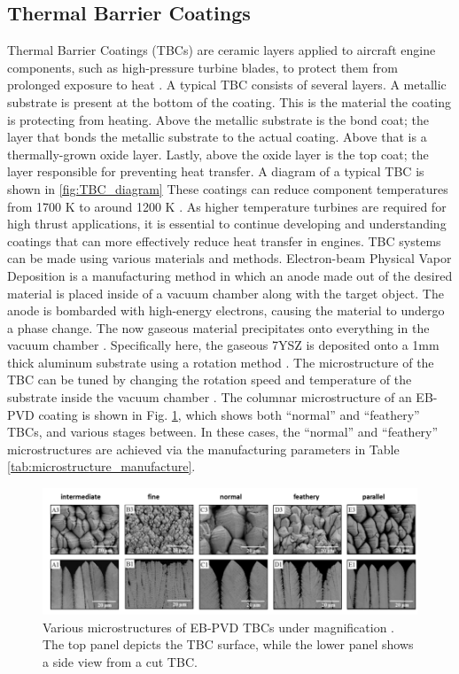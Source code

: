 \documentclass{UCF_ETD}
\begin{document}
\subsection{Thermal Barrier Coatings}
Thermal Barrier Coatings (TBCs) are ceramic layers applied to aircraft engine components, such as high-pressure turbine blades, to protect them from prolonged exposure to heat \cite{Bennett2005}. A typical TBC consists of several layers. A metallic substrate is present at the bottom of the coating. This is the material the coating is protecting from heating. Above the metallic substrate is the bond coat; the layer that bonds the metallic substrate to the actual coating. Above that is a thermally-grown oxide layer. Lastly, above the oxide layer is the top coat; the layer responsible for preventing heat transfer. A diagram of a typical TBC is shown in \ref{fig:TBC_diagram} These coatings can reduce component temperatures from 1700 K to around 1200 K \cite{Sirigiri2018}. As higher temperature turbines are required for high thrust applications, it is essential to continue developing and understanding coatings that can more effectively reduce heat transfer in engines. TBC systems can be made using various materials and methods. Electron-beam Physical Vapor Deposition is a manufacturing method in which an anode made out of the desired material is placed inside of a vacuum chamber along with the target object. The anode is bombarded with high-energy electrons, causing the material to undergo a phase change. The now gaseous material precipitates onto everything in the vacuum chamber \cite{EBPVD}. Specifically here, the gaseous 7YSZ is deposited onto a 1mm thick aluminum substrate using a rotation method \cite{Renteria2007}. The microstructure of the TBC can be tuned by changing the rotation speed and temperature of the substrate inside the vacuum chamber \cite{Naraparaju2017}. The columnar microstructure of an EB-PVD coating is shown in Fig. \ref{Fig1}, which shows both ``normal'' and ``feathery'' TBCs, and various stages between. In these cases, the ``normal'' and ``feathery'' microstructures are achieved via the manufacturing parameters in Table \ref{tab:microstructure_manufacture}.

\begin{figure}[htp!]
\centering
\includegraphics[width=.9\textwidth]{Figures/Fig1.png}
\caption{Various microstructures of EB-PVD TBCs under magnification \cite{Renteria2007}. The top panel depicts the TBC surface, while the lower panel shows a side view from a cut TBC. }
\label{Fig1}
\end{figure}
\end{document}
